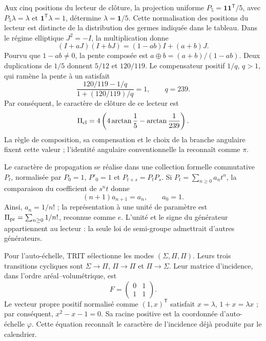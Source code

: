 Aux cinq positions du lecteur de clôture, la projection uniforme
\(P_5=\mathbf1\mathbf1^{\mathsf T}/5\), avec
\(P_5\lambda=\lambda\) et \(\mathbf1^{\mathsf T}\lambda=1\), détermine
\(\lambda=\mathbf1/5\). Cette normalisation des positions du lecteur
est distincte de la distribution des germes indiquée dans le tableau.
Dans le régime elliptique \(J^2=-I\), la multiplication donne
\[
(I+aJ)(I+bJ)=(1-ab)I+(a+b)J.
\]
Pourvu que \(1-ab\ne0\), la pente composée est
\(a\oplus b=(a+b)/(1-ab)\). Deux duplications de \(1/5\) donnent
\(5/12\) et \(120/119\). Le compensateur positif \(1/q\), \(q>1\),
qui ramène la pente à un satisfait
\[
\frac{120/119-1/q}{1+(120/119)/q}=1,
\qquad q=239.
\]
Par conséquent, le caractère de clôture de ce lecteur est
\begin{equation}
 \Pi_{\rm cl}=4\left(4\arctan\frac15-\arctan\frac1{239}\right).
 \label{vi:dep:lector-clausura}
\end{equation}
La règle de composition, sa compensation et le choix de la branche angulaire
fixent cette valeur ; l’identité angulaire conventionnelle la reconnaît comme \(\pi\).

Le caractère de propagation se réalise dans une collection formelle commutative
\(P_t\), normalisée par \(P_0=1\), \(P'_0=1\) et
\(P_{t+s}=P_tP_s\). Si \(P_t=\sum_{n\ge0}a_nt^n\), la comparaison
du coefficient de \(s^nt\) donne
\[
 (n+1)a_{n+1}=a_n,\qquad a_0=1.
\]
Ainsi, \(a_n=1/n!\) ; la représentation à une unité de paramètre est
\(\Pi_{\rm pr}=\sum_{n\ge0}1/n!\), reconnue comme \(e\).
L’unité et le signe du générateur appartiennent au lecteur : la seule loi
de semi-groupe admettrait d’autres générateurs.

Pour l’auto-échelle, TRIT sélectionne les modes
\((\Sigma,\Pi,\Pi)\). Leurs trois transitions cycliques sont
\(\Sigma\to\Pi\), \(\Pi\to\Pi\) et \(\Pi\to\Sigma\). Leur matrice
d’incidence, dans l’ordre aréal--volumétrique, est
\begin{equation}
 F=\begin{pmatrix}0&1\\1&1\end{pmatrix}.
 \label{vi:dep:incidencia-hojas}
\end{equation}
Le vecteur propre positif normalisé comme \((1,x)^{\mathsf T}\)
satisfait \(x=\lambda\), \(1+x=\lambda x\) ; par conséquent,
\(x^2-x-1=0\). Sa racine positive est la coordonnée d’auto-échelle
\(\varphi\). Cette équation reconnaît le caractère de l’incidence déjà
produite par le calendrier.


